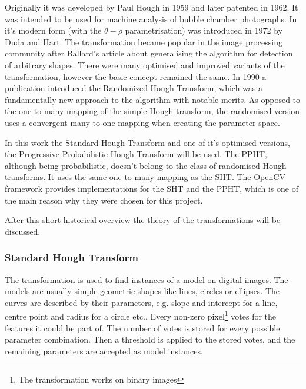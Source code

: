 Originally it was developed by Paul Hough in 1959 and later patented in 1962\cite{houghPatent}.
It was intended to be used for machine analysis of bubble chamber photographs.
In it's modern form (with the $\theta-\rho$ parametrisation) was introduced in 1972 by Duda and Hart\cite{houghThetaRho}.
The transformation became popular in the image processing community after Ballard's article\cite{BALLARD1981111} about generalising the algorithm for detection of arbitrary shapes.
There were many optimised and improved variants of the transformation, however the basic concept remained the same.
In 1990 a publication\cite{XU1990331} introduced the Randomized Hough Transform, which was a fundamentally new approach to the algorithm with notable merits.
As opposed to the one-to-many mapping of the simple Hough transform, the randomised version uses a convergent many-to-one mapping when creating the parameter space.

In this work the Standard Hough Transform and one of it's optimised versions, the Progressive Probabilistic Hough Transform will be used.
The PPHT, although being probabilistic, doesn't belong to the class of randomised Hough transforms.
It uses the same one-to-many mapping as the SHT.
The OpenCV framework provides implementations for the SHT and the PPHT, which is one of the main reason why they were chosen for this project.

After this short historical overview the theory of the transformations will be discussed.

\subsubsection{Standard Hough Transform}

The transformation is used to find instances of a model on digital images.
The models are usually simple geometric shapes like lines, circles or ellipses.
The curves are described by their parameters, e.g. slope and intercept for a line, centre point and radius for a circle etc..
Every non-zero pixel\footnote{The transformation works on binary images} votes for the features it could be part of.
The number of votes is stored for every possible parameter combination.
Then a threshold is applied to the stored votes, and the remaining parameters are accepted as model instances.
	
